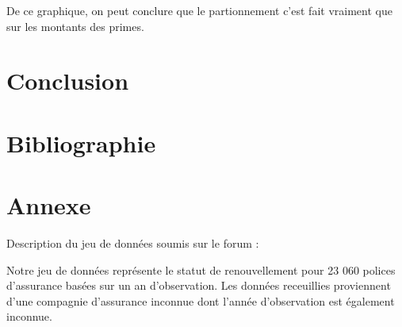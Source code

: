 \documentclass[
]{article}
\begin{document}
De ce graphique, on peut conclure que le partionnement c'est fait
vraiment que sur les montants des primes.

\newpage

\hypertarget{conclusion}{%
\section{Conclusion}\label{conclusion}}

\newpage

\hypertarget{bibliographie}{%
\section{Bibliographie}\label{bibliographie}}

\newpage

\hypertarget{annexe}{%
\section{Annexe}\label{annexe}}

Description du jeu de données soumis sur le forum :

Notre jeu de données représente le statut de renouvellement pour 23 060
polices d'assurance basées sur un an d'observation. Les données
receuillies proviennent d'une compagnie d'assurance inconnue dont
l'année d'observation est également inconnue.
\end{document}
